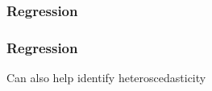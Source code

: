 \documentclass[handout]{beamer}
\begin{document}


   \begin{frame}
   \frametitle{Regression}
   \begin{center}
   \end{center}

   \end{frame}



   \begin{frame}
   \frametitle{Regression}
   \begin{center}
   \end{center}
   Can also help identify heteroscedasticity
   \end{frame}


   \begin{frame} 

   \end{frame}

   
\end{document}
